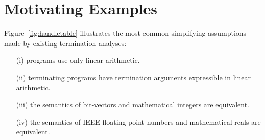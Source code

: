 \documentclass[a4paper]{llncs}
\begin{document}
\section{Motivating Examples} \label{sec:motivation}

Figure~\ref{fig:handletable} illustrates the most common simplifying
assumptions made by existing termination analyses:
%
\begin{itemize}
\item[(i)] programs use only linear arithmetic.
\item[(ii)] terminating programs have termination arguments expressible in linear arithmetic.
\item[(iii)] the semantics of bit-vectors and mathematical integers are equivalent.
\item[(iv)] the semantics of IEEE floating-point numbers and mathematical reals are equivalent.
\end{itemize}  
\end{document}
